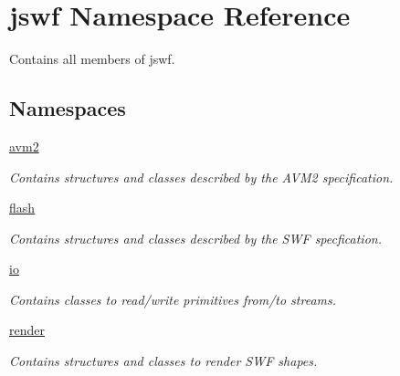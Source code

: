 \hypertarget{namespacejswf}{\section{jswf Namespace Reference}
\label{namespacejswf}
}


Contains all members of jswf.  


\subsection*{Namespaces}
\begin{DoxyCompactItemize}
\item 
 \hyperlink{namespacejswf_1_1avm2}{avm2}
\begin{DoxyCompactList}\small\item\em Contains structures and classes described by the A\+V\+M2 specification. \end{DoxyCompactList}\item 
 \hyperlink{namespacejswf_1_1flash}{flash}
\begin{DoxyCompactList}\small\item\em Contains structures and classes described by the S\+W\+F specfication. \end{DoxyCompactList}\item 
 \hyperlink{namespacejswf_1_1io}{io}
\begin{DoxyCompactList}\small\item\em Contains classes to read/write primitives from/to streams. \end{DoxyCompactList}\item 
 \hyperlink{namespacejswf_1_1render}{render}
\begin{DoxyCompactList}\small\item\em Contains structures and classes to render S\+W\+F shapes. \end{DoxyCompactList}\end{DoxyCompactItemize}
